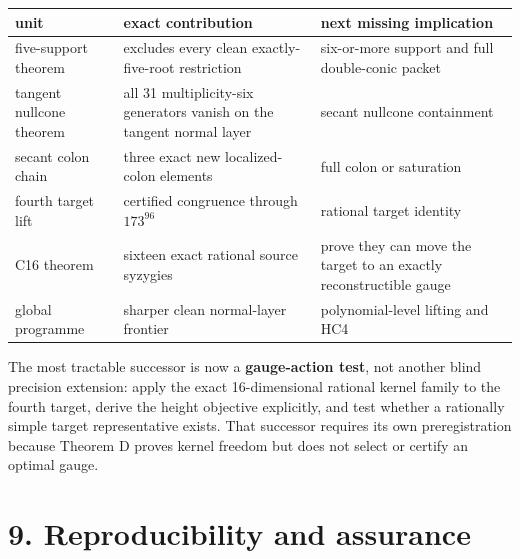 \documentclass[
  11pt,
]{article}
\newcounter{none} %
\begin{document}
{\def\LTcaptype{none} %
\begin{longtable}[]{@{}
  >{\raggedright\arraybackslash}p{}
  >{\raggedright\arraybackslash}p{}
  >{\raggedright\arraybackslash}p{}@{}}
\toprule\noalign{}
\begin{minipage}[b]{\linewidth}\raggedright
unit
\end{minipage} & \begin{minipage}[b]{\linewidth}\raggedright
exact contribution
\end{minipage} & \begin{minipage}[b]{\linewidth}\raggedright
next missing implication
\end{minipage} \\
\midrule\noalign{}
\endhead
\bottomrule\noalign{}
\endlastfoot
five-support theorem & excludes every clean exactly-five-root
restriction & six-or-more support and full double-conic packet \\
tangent nullcone theorem & all 31 multiplicity-six generators vanish on
the tangent normal layer & secant nullcone containment \\
secant colon chain & three exact new localized-colon elements & full
colon or saturation \\
fourth target lift & certified congruence through \(173^{96}\) &
rational target identity \\
C16 theorem & sixteen exact rational source syzygies & prove they can
move the target to an exactly reconstructible gauge \\
global programme & sharper clean normal-layer frontier &
polynomial-level lifting and HC4 \\
\end{longtable}
}

The most tractable successor is now a \textbf{gauge-action test}, not
another blind precision extension: apply the exact 16-dimensional
rational kernel family to the fourth target, derive the height objective
explicitly, and test whether a rationally simple target representative
exists. That successor requires its own preregistration because Theorem
D proves kernel freedom but does not select or certify an optimal gauge.

\section{9. Reproducibility and
assurance}\label{reproducibility-and-assurance}
\end{document}

